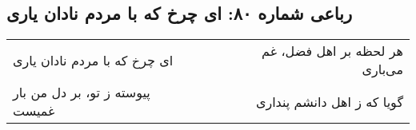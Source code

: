 \begin{center}
\section*{رباعی شماره ۸۰: ای چرخ که با مردم نادان یاری}
\label{sec:080}
\begin{longtable}{l p{0.5cm} r}
ای چرخ که با مردم نادان یاری
&&
هر لحظه بر اهل فضل، غم می‌باری
\\
پیوسته ز تو، بر دل من بار غمیست
&&
گویا که ز اهل دانشم پنداری
\\
\end{longtable}
\end{center}

